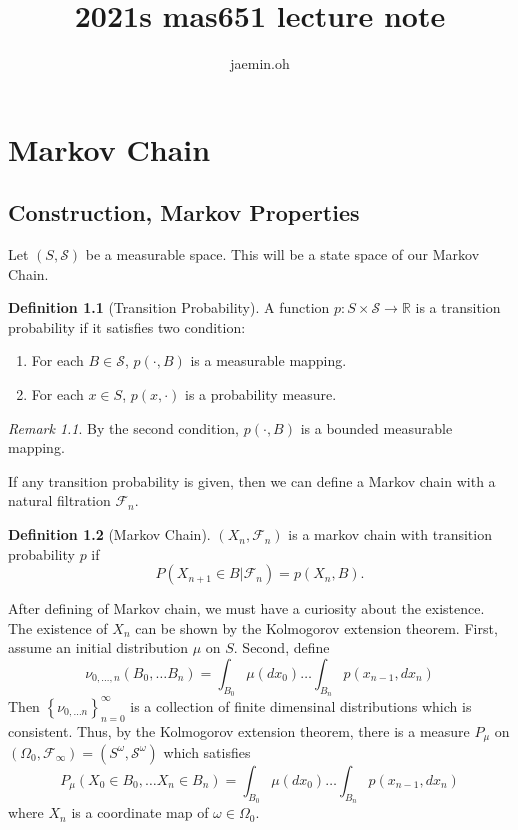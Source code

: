\documentclass{memoir}
\author{jaemin.oh}
\theoremstyle{definition}
\newtheorem{definition}{Definition}[section]
\theoremstyle{remark}
\newtheorem*{remark}{Remark}
\begin{document}
\title{2021s mas651 lecture note}
\maketitle
\tableofcontents

\chapter{Markov Chain}
\section{Construction, Markov Properties}
Let $(S, \mathcal{S})$ be a measurable space.
This will be a state space of our Markov Chain.

\begin{definition}[Transition Probability]
	A function $p:S \times \mathcal{S} \rightarrow \mathbb{R}$ is a transition probability if it satisfies two condition:
	\begin{enumerate}
		\item For each $B\in \mathcal{S}$, $p(\cdot, B)$ is a measurable mapping.
		\item For each $x \in S$, $p(x, \cdot)$ is a probability measure.
	\end{enumerate}
\end{definition}

\begin{remark}
	By the second condition, $p(\cdot, B)$ is a bounded measurable mapping.
	\label{transprob}
\end{remark}

If any transition probability is given, then we can define a Markov chain with a natural filtration $\mathcal{F}_n$.

\begin{definition}[Markov Chain]
	$(X_n, \mathcal{F}_n)$ is a markov chain with transition probability $p$ if
\[
	P\left( X_{n+1} \in B \lvert \mathcal{F}_n \right) = p\left( X_n, B \right).
\]
	
	\label{markovchain}
\end{definition}

After defining of Markov chain, we must have a curiosity about the existence.
The existence of $X_n$ can be shown by the Kolmogorov extension theorem.
First, assume an initial distribution $\mu$ on $S$.
Second, define
\[
	\nu_{0, \dots, n}\left( B_0, \dots B_n \right) = \int_{B_0}\mu(dx_0) \dots \int_{B_n}p(x_{n-1}, dx_n)
\]
Then $\left\{ \nu_{0, \dots n} \right\}_{n=0} ^\infty$ is a collection of finite dimensinal distributions which is consistent.
Thus, by the Kolmogorov extension theorem, there is a measure $P_\mu$ on $(\Omega_0, \mathcal{F}_{\infty}) = (S^\omega, \mathcal{S}^\omega)$ which satisfies
\[
	P_\mu \left (X_0 \in B_0 , \dots X_n \in B_n\right ) = \int_{B_0}\mu(dx_0)\dots \int_{B_n}p(x_{n-1}, dx_n)
\]
where $X_n$ is a coordinate map of $\omega \in \Omega_0$.
\end{document}
